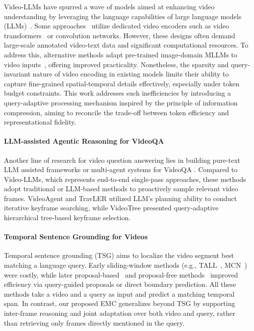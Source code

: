 Video-LLMs have spurred a wave of models aimed at enhancing video understanding by leveraging the language capabilities of large language models (LLMs)~\citep{lin2023video, Ma_2024_CVPR, 10658165, Li2023LLaMAVIDAI, liu2024llavanext, Xu2024PLLaVAP, InternVL3, qwen2.5vl, qwen3vl, llavaonevision}. Some approaches~\citep{chen2023video-LLMmodelingvideosequence, 10658165, 2023videochat} utilize dedicated video encoders such as video transformers~\citep{gberta_2021_ICML} or convolution networks. However, these designs often demand large-scale annotated video-text data and significant computational resources. To address this, alternative methods adapt pre-trained image-domain MLLMs to video inputs~\citep{10658172, maaz-etal-2024-video}, offering improved practicality. Nonetheless, the sparsity and query-invariant nature of video encoding in existing models limits their ability to capture fine-grained spatial-temporal details effectively, especially under token budget constraints. This work addresses such inefficiencies by introducing a query-adaptive processing mechanism inspired by the principle of information compression, aiming to reconcile the trade-off between token efficiency and representational fidelity.

\paragraph{LLM-assisted Agentic Reasoning for VideoQA}
Another line of research for video question answering lies in building pure-text LLM assisted frameworks or multi-agent systems for VideoQA \citep{wang2024videotreeadaptivetreebasedvideo, shang-etal-2024-traveler, VideoAgent}. Compared to Video-LLMs, which represents end-to-end single-pass approaches, these methods adopt traditional or LLM-based methods to proactively sample relevant video frames. VideoAgent \citep{VideoAgent} and TravLER \citep{shang-etal-2024-traveler} utilized LLM's planning ability to conduct iterative keyframe searching, while VideoTree \citep{wang2024videotreeadaptivetreebasedvideo} presented query-adaptive hierarchical tree-based keyframe selection. 

\paragraph{Temporal Sentence Grounding for Videos}

Temporal sentence grounding (TSG) aims to localize the video segment best matching a language query. Early sliding-window methods (e.g., TALL~\citep{8237825}, MCN~\citep{8237880}) were costly, while later proposal-based~\citep{xu2019multilevel,10.1609/aaai.v33i01.33018199} and proposal-free methods~\citep{10.1609/aaai.v33i01.33019159,zhang-etal-2020-span} improved efficiency via query-guided proposals or direct boundary prediction. All these methods take a video and a query as input and predict a matching temporal span. In contrast, our proposed EMC generalizes beyond TSG by supporting inter-frame reasoning and joint adaptation over both video and query, rather than retrieving only frames directly mentioned in the query.

